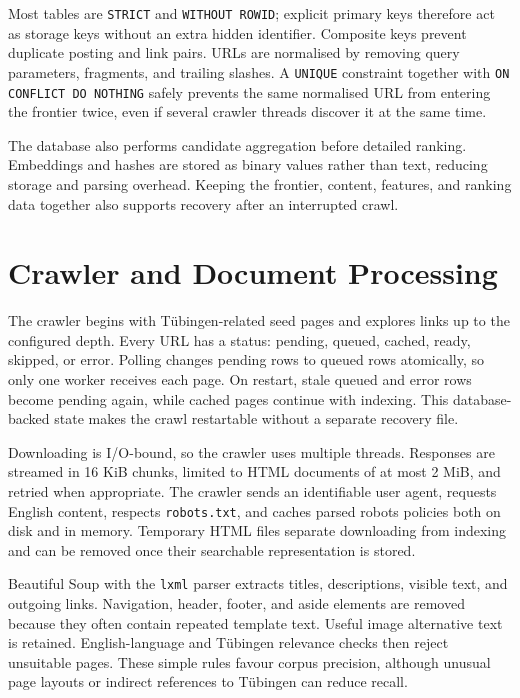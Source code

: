 \documentclass[12pt,a4paper]{article}
\begin{document}
Most tables are \texttt{STRICT} and \texttt{WITHOUT ROWID}; explicit primary keys therefore act as storage keys without an extra hidden identifier. Composite keys prevent duplicate posting and link pairs. URLs are normalised by removing query parameters, fragments, and trailing slashes. A \texttt{UNIQUE} constraint together with \texttt{ON CONFLICT DO NOTHING} safely prevents the same normalised URL from entering the frontier twice, even if several crawler threads discover it at the same time.

The database also performs candidate aggregation before detailed ranking. Embeddings and hashes are stored as binary values rather than text, reducing storage and parsing overhead. Keeping the frontier, content, features, and ranking data together also supports recovery after an interrupted crawl.

\section{Crawler and Document Processing}

The crawler begins with Tübingen-related seed pages and explores links up to the configured depth. Every URL has a status: pending, queued, cached, ready, skipped, or error. Polling changes pending rows to queued rows atomically, so only one worker receives each page. On restart, stale queued and error rows become pending again, while cached pages continue with indexing. This database-backed state makes the crawl restartable without a separate recovery file.

Downloading is I/O-bound, so the crawler uses multiple threads. Responses are streamed in 16 KiB chunks, limited to HTML documents of at most 2 MiB, and retried when appropriate. The crawler sends an identifiable user agent, requests English content, respects \texttt{robots.txt}, and caches parsed robots policies both on disk and in memory. Temporary HTML files separate downloading from indexing and can be removed once their searchable representation is stored.

Beautiful Soup with the \texttt{lxml} parser extracts titles, descriptions, visible text, and outgoing links. Navigation, header, footer, and aside elements are removed because they often contain repeated template text. Useful image alternative text is retained. English-language and Tübingen relevance checks then reject unsuitable pages. These simple rules favour corpus precision, although unusual page layouts or indirect references to Tübingen can reduce recall.
\end{document}
